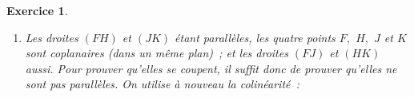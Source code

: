 \documentclass[10pt]{article}
\newtheorem{exo}{Exercice}
\begin{document}
\begin{exo}
\begin{multicols}{2}
\begin{enumerate}
\begin{align*}&\overrightarrow{FH}\begin{pmatrix} x_H-x_F\\y_H-y_F\\z_H-z_F \end{pmatrix}\qquad 
\overrightarrow{FH}\begin{pmatrix} 0-1\\1-0\\1-1\end{pmatrix}\qquad \overrightarrow{FH}\begin{pmatrix} -1
\\1\\0 \end{pmatrix}\\
&\overrightarrow{JK}\begin{pmatrix} x_K-x_J\\y_K-y_J\\z_K-z_J \end{pmatrix}\qquad 
\overrightarrow{JK}\begin{pmatrix} 0,5-1\\1-0,5\\0-0\end{pmatrix}\qquad \overrightarrow{JK}\begin{pmatrix} -0,5
\\0,5\\0 \end{pmatrix}
\end{align*}

\medskip

On voit que $\overrightarrow{FH}=2\overrightarrow{JK},$ donc $\overrightarrow{FH}$ et $\overrightarrow{JK}$ sont colinéaires~; et donc les droites $(FH)$ et $(JK)$ sont parallèles.
\item Les droites $(FH)$ et $(JK)$ étant parallèles, les quatre points $F,$ $H,$ $J$ et $K$ sont coplanaires (dans un même plan)~; et les droites $(FJ)$ et $(HK)$ aussi. Pour prouver qu'elles se coupent, il suffit donc de prouver qu'elles ne sont pas parallèles. On utilise à nouveau la colinéarité~:


\end{enumerate}
\end{multicols}
\end{exo}
\end{document}

